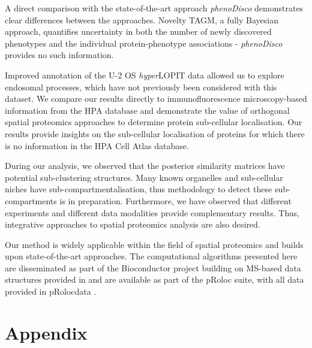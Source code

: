\documentclass[12pt,english]{article}
\begin{document}
A direct comparison with the state-of-the-art approach \textit{phenoDisco} demonstrates clear differences between the approaches. Novelty TAGM, a fully Bayesian approach, quantifies uncertainty in both the number of newly discovered phenotypes and the individual protein-phenotype associations - \textit{phenoDisco} provides no such information.

Improved annotation of the U-2 OS \textit{hyper}LOPIT data allowed us to explore endosomal processes, which have not previously been considered with this dataset. We compare our results directly to immunofluorescence microscopy-based information from the HPA database and demonstrate the value of orthogonal spatial proteomics approaches to determine protein sub-cellular localisation. Our results provide insights on the sub-cellular localisation of proteins for which there is no information in the HPA Cell Atlas database. 

During our analysis, we observed that the posterior similarity matrices have potential sub-clustering structures. Many known organelles and sub-cellular niches have sub-compartmentalisation, thus methodology to detect these sub-compartments is in preparation. Furthermore, we have observed that different experiments and different data modalities provide complementary results. Thus, integrative approaches to spatial proteomics analysis are also desired. 

Our method is widely applicable within the field of spatial proteomics and builds upon state-of-the-art approaches. The computational algorithms presented here are disseminated as part of the Bioconductor project \citep{Bioconductor::2004, Huber:2015} building on MS-based data structures provided in \cite{MSnbase:2012} and are available as part of the pRoloc suite, with all data provided in pRolocdata \citep{pRoloc:2014}.

\pagebreak
\section{Appendix}
\end{document}
